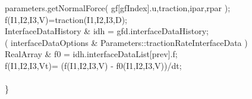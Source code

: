 \documentclass[11pt]{article}
\begin{document}
\begin{flushleft}
\ic       parameters.getNormalForce( gf[gfIndex].u,traction,ipar,rpar ); \\
\ic       f(I1,I2,I3,V)=traction(I1,I2,I3,D); \\
\ic       InterfaceDataHistory \& idh = gfd.interfaceDataHistory;  \\
\ic       \IF( interfaceDataOptions \& Parameters::tractionRateInterfaceData )\\
\id         RealArray \& f0 = idh.interfaceDataList[prev].f;  \\
\id         f(I1,I2,I3,Vt)= (f(I1,I2,I3,V) - f0(I1,I2,I3,V))/dt;  \\
\ia   \\
\}
\end{flushleft}



% 
% 
\end{document}
